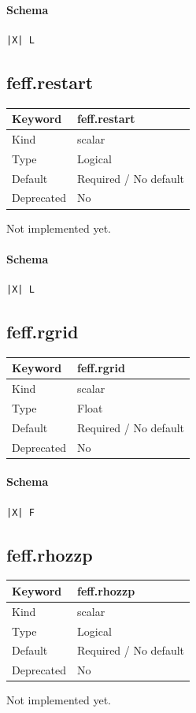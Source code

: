 \documentclass[11pt]{article}
\begin{document}
{{{{\paragraph{Schema}
\begin{Verbatim}
|X| L
\end{Verbatim}

\subsection{feff.restart}
\label{kw:feff-restart}
\begin{longtable}{|p{1.5in}|p{4.5in}|}
\hline
Keyword & feff.restart \\
\hline
Kind & scalar \\
\hline
Type & Logical \\
\hline
Default & Required / No default \\
\hline
Deprecated & No \\
\hline
\end{longtable}
 Not implemented yet.

\paragraph{Schema}
\begin{Verbatim}
|X| L
\end{Verbatim}

\subsection{feff.rgrid}
\label{kw:feff-rgrid}
\begin{longtable}{|p{1.5in}|p{4.5in}|}
\hline
Keyword & feff.rgrid \\
\hline
Kind & scalar \\
\hline
Type & Float \\
\hline
Default & Required / No default \\
\hline
Deprecated & No \\
\hline
\end{longtable}
\paragraph{Schema}
\begin{Verbatim}
|X| F
\end{Verbatim}

\subsection{feff.rhozzp}
\label{kw:feff-rhozzp}
\begin{longtable}{|p{1.5in}|p{4.5in}|}
\hline
Keyword & feff.rhozzp \\
\hline
Kind & scalar \\
\hline
Type & Logical \\
\hline
Default & Required / No default \\
\hline
Deprecated & No \\
\hline
\end{longtable}
 Not implemented yet.

}}}}
\end{document}

